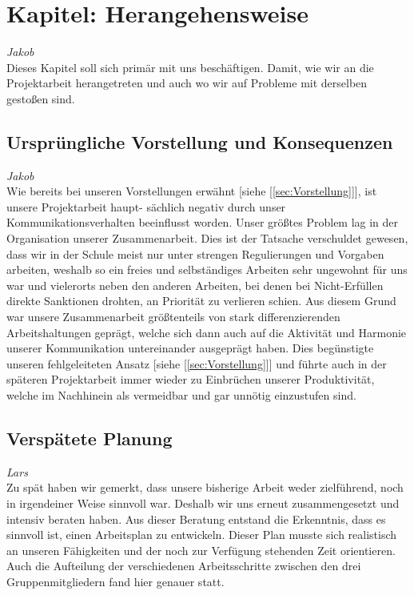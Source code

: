 \documentclass[12pt,a4paper,bibliography=totocnumbered,listof=totocnumbered]{scrartcl}
\begin{document}
\onehalfspacing
\renewcommand{\thesection}{\arabic{section}}
\renewcommand{\theHsection}{\arabic{section}}
\setcounter{section}{0}
\setcounter{page}{1}

\section{Kapitel: Herangehensweise}
\emph{Jakob}\\
Dieses Kapitel soll sich primär mit uns beschäftigen.
Damit, wie wir an die Projektarbeit herangetreten und auch wo wir auf Probleme mit derselben gestoßen sind.

\subsection{Ursprüngliche Vorstellung und Konsequenzen}
\emph{Jakob}\\
Wie bereits bei unseren Vorstellungen erwähnt [siehe [\ref{sec:Vorstellung}]], ist unsere Projektarbeit haupt- sächlich negativ durch unser Kommunikationsverhalten beeinflusst worden.
Unser größtes Problem lag in der Organisation unserer Zusammenarbeit. Dies ist der Tatsache verschuldet gewesen, dass wir in der Schule meist nur unter strengen Regulierungen und Vorgaben arbeiten, weshalb so ein freies und selbständiges Arbeiten sehr ungewohnt für uns war und vielerorts neben den anderen Arbeiten, bei denen bei \glqq Nicht-Erfüllen\grqq{} direkte Sanktionen drohten, an Priorität zu verlieren schien.
Aus diesem Grund war unsere Zusammenarbeit größtenteils von stark differenzierenden Arbeitshaltungen geprägt, welche sich dann auch auf die Aktivität und Harmonie unserer Kommunikation untereinander ausgeprägt haben.
Dies begünstigte unseren fehlgeleiteten Ansatz [siehe [\ref{sec:Vorstellung}]] und führte auch in der späteren Projektarbeit immer wieder zu Einbrüchen unserer Produktivität, welche im Nachhinein als vermeidbar und gar unnötig einzustufen sind.

\subsection{Verspätete Planung}
\emph{Lars}\\
Zu spät haben wir gemerkt, dass unsere bisherige Arbeit weder zielführend, noch in irgendeiner Weise sinnvoll war. Deshalb wir uns erneut zusammengesetzt und intensiv beraten haben. Aus dieser Beratung entstand die Erkenntnis, dass es sinnvoll ist, einen Arbeitsplan zu entwickeln. Dieser Plan musste sich realistisch an unseren Fähigkeiten und der noch zur Verfügung stehenden Zeit orientieren. Auch die Aufteilung der verschiedenen Arbeitsschritte zwischen den  drei Gruppenmitgliedern fand hier genauer statt.
\end{document}
